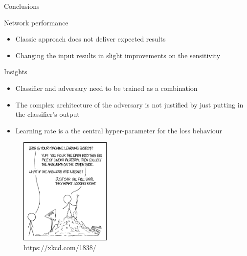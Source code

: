 
\begin{frame}{Conclusions}
    \begin{block}{Network performance}
        \begin{itemize}
            \item Classic approach does not deliver expected results
            \item Changing the input results in slight improvements on the sensitivity
        \end{itemize}
    \end{block}
    \begin{block}{Insights}
        \begin{itemize}
        	\item Classifier and adversary need to be trained as a combination
            \item The complex architecture of the adversary is not justified by just putting in the classifier's output
            \item Learning rate is a the central hyper-parameter for the loss behaviour
        \end{itemize}
    \end{block}
\end{frame}

\begin{frame}{}
    \begin{figure}
        \centering
        \includegraphics[width=0.4\textwidth]{xkcd}
        \caption{https://xkcd.com/1838/}
    \end{figure}
\end{frame}
